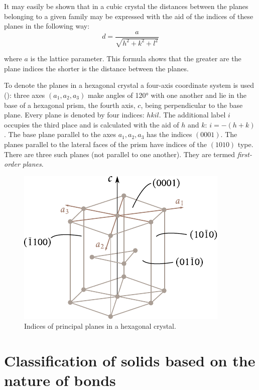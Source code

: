 It may easily be shown that in a cubic crystal the distances between the planes belonging to a given family may be expressed with the aid of the indices of these planes in the following way:
\begin{equation}\label{eq:1_17}
	d = \frac{a}{\sqrt{h^2 + k^2 + l^2}}
\end{equation}

\noindent
where $a$ is the lattice parameter. This formula shows that the greater are the plane indices the shorter is the distance between the planes.

To denote the planes in a hexagonal crystal a four-axis coordinate system is used (): three axes $(a_1, a_2, a_3)$ make angles of \ang{120} with one another and lie in the base of a hexagonal prism, the fourth axis, $c$, being perpendicular to the base plane. Every plane is denoted by four indices: $hkil$. The additional label $i$ occupies the third place and is calculated with the aid of $h$ and $k$: $i=-(h+k)$. The base plane parallel to the axes $a_1, a_2, a_3$ has the indices $(0001)$. The planes parallel to the lateral faces of the prism have indices of the $(1010)$ type. There are three such planes (not parallel to one another). They are termed \textit{first-order planes}.

\begin{figure}[t]
	\begin{center}
		\includegraphics[scale=1.0]{figures/ch_01/fig_1_18.pdf}
		\caption[]{Indices of principal planes in a hexagonal crystal.}
		\label{fig:1_18}
	\end{center}
	\vspace{-0.7cm}
\end{figure}

\section{Classification of solids based on the nature of bonds}\label{sec:10}

